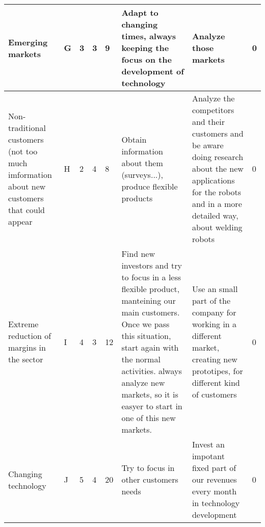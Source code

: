 \begin{landscape}
\begin{table}[h!]
\begin{tabular}[0.8\textswidth]{|p{5cm} |p{1cm} |p{2cm} |p{2cm} |p{1cm} |p{2.8cm} |p{2.8cm} |p{2cm}|}
\hline
Emerging markets & G & 3 & 3 & 9 & Adapt to changing times, always keeping the focus on the development of technology & Analyze those markets & 0 \\
\hline
Non-traditional customers (not too much imformation about new customers that could appear &H & 2 & 4 & 8 & Obtain information about them (surveys...), produce flexible products & Analyze the competitors and their customers and be aware doing research about the new applications for the robots and in a more detailed way, about welding robots & 0 \\ 
\hline
Extreme reduction of margins in the sector & I & 4 & 3 & 12 & Find new investors and try to focus in a less flexible product, manteining our main customers. Once we pass this situation, start again with the normal activities. always analyze new markets, so it is easyer to start in one of this new markets. & Use an small part of the company for working in a different market, creating new prototipes, for different kind of customers & 0 \\
\hline
Changing technology & J & 5 & 4 & 20 & Try to focus in other customers needs & Invest an impotant fixed part of our revenues every month in technology development & 0 \\
\hline
\end{tabular}
\end{table}


\end{landscape}
